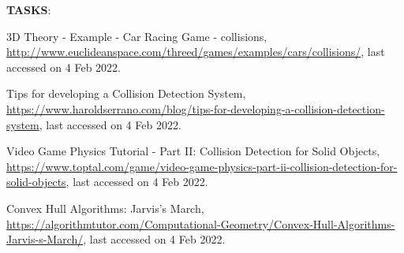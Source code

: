 \documentclass[a4paper]{exam}
\begin{document}
\begin{questions}
  \textbf{TASKS}:
  
  \begin{solution}
  \end{solution}


\end{questions}

\begin{thebibliography}{9}
  3D Theory - Example - Car Racing Game - collisions, \url{http://www.euclideanspace.com/threed/games/examples/cars/collisions/}, last accessed on 4 Feb 2022.

Tips for developing a Collision Detection System, \url{https://www.haroldserrano.com/blog/tips-for-developing-a-collision-detection-system}, last accessed on 4 Feb 2022.

Video Game Physics Tutorial - Part II: Collision Detection for Solid Objects, \url{https://www.toptal.com/game/video-game-physics-part-ii-collision-detection-for-solid-objects}, last accessed on 4 Feb 2022.

Convex Hull Algorithms: Jarvis's March, \url{https://algorithmtutor.com/Computational-Geometry/Convex-Hull-Algorithms-Jarvis-s-March/}, last accessed on 4 Feb 2022.
\end{thebibliography}
\end{document}
